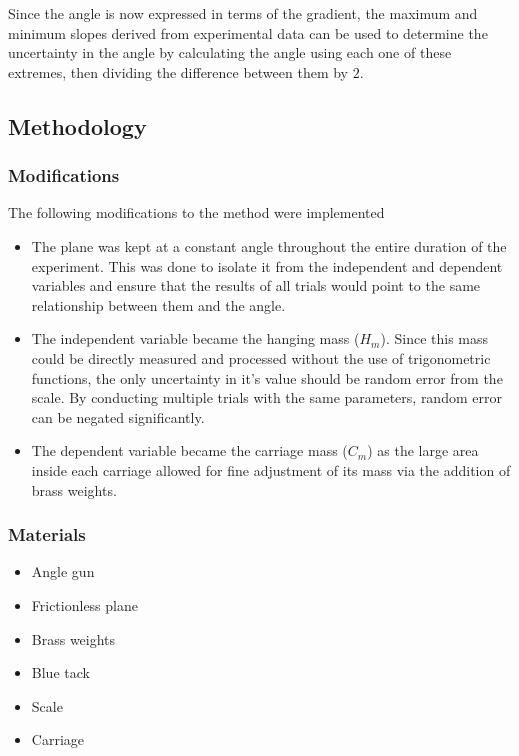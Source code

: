 \documentclass[11pt,a4paper]{article}
\begin{document}
Since the angle is now expressed in terms of the gradient, the maximum and minimum slopes derived from experimental data can be used to determine the uncertainty in the angle by calculating the angle using each one of these extremes, then dividing the difference between them by $2$.




\subsection{Methodology}

\subsubsection{Modifications}


The following modifications to the method were implemented
\begin{itemize}
	\item The plane was kept at a constant angle throughout the entire duration of the experiment. This was done to isolate it from the independent and dependent variables and ensure that the results of all trials would point to the same relationship between them and the angle.
	\item The independent variable became the hanging mass ($H_m$). Since this mass could be directly measured and processed without the use of trigonometric functions, the only uncertainty in it's value should be random error from the scale. By conducting multiple trials with the same parameters, random error can be negated significantly. 
	\item The dependent variable became the carriage mass ($C_m$) as the large area inside each carriage allowed for fine adjustment of its mass via the addition of brass weights. 
\end{itemize}

\subsubsection{Materials}
\begin{itemize}
	\item Angle gun 
	\item Frictionless plane
	\item Brass weights
	\item Blue tack 
	\item Scale
	\item Carriage
\end{itemize}
\end{document}
